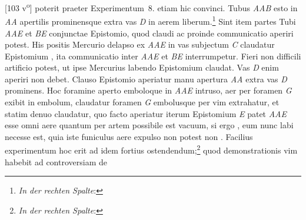 [103 v\textsuperscript{o}]  poterit praeter Experimentum~8. etiam hic convinci. Tubus \textit{AAB} esto in \textit{AA} apertilis prominensque  extra vas \textit{D} in aerem liberum.\footnote{\textit{In der rechten Spalte}: } Sint item partes Tubi \textit{AAE} et \textit{BE} conjunctae Epistomio\protect{}, quod claudi  ac proinde communicatio aperiri potest. His positis Mercurio\protect{} delapso ex \textit{AAE} in vas subjectum \textit{C}  claudatur Epistomium\protect{} , ita communicatio  inter \textit{AAE} et \textit{BE} interrumpetur. Fieri non difficili  artificio potest, ut ipse Mercurius\protect{} labendo Epistomium\protect{}  claudat. Vas \textit{D} enim aperiri non debet. Clauso Epistomio\protect{} aperiatur manu apertura \textit{AA} extra  vas \textit{D} prominens.  Hoc foramine aperto emboloque\protect{} in \textit{AAE} intruso, aer  per foramen \textit{G} exibit in embolum\protect{}, claudatur  foramen \textit{G} embolusque\protect{} per vim extrahatur, et  statim  denuo claudatur,  quo facto aperiatur iterum Epistomium\protect{} \textit{E} patet \textit{AAE} esse omni aere quantum per artem possibile  est vacuum, si ergo , eum nunc labi necesse est, quia  iste funiculus\protect{} aere expulso non potest non .  Facilius experimentum hoc erit ad  idem fortius ostendendum;\footnote{\textit{In der rechten Spalte}: } quod demonstrationis vim  habebit ad controversiam de 